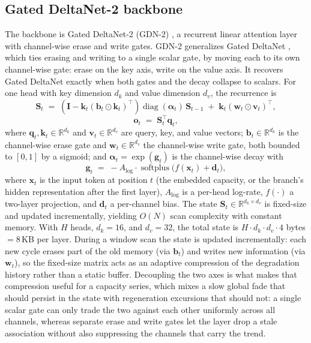\documentclass[final,5p,times,twocolumn]{elsarticle}
\begin{document}
\subsection{Gated DeltaNet-2 backbone}
\label{sec:gdn2}

The backbone is Gated DeltaNet-2 (GDN-2) \cite{ref_gdn2}, a
recurrent linear attention layer with channel-wise erase and write
gates. GDN-2 generalizes Gated DeltaNet \cite{ref_gdn}, which ties
erasing and writing to a single scalar gate, by moving each to its own
channel-wise gate: erase on the key axis, write on the value axis. It
recovers Gated DeltaNet exactly when both gates and the decay
collapse to scalars. For one head with key dimension $d_k$ and value dimension
$d_v$, the recurrence is
\begin{equation}
\label{eq:gdn2}
\mathbf{S}_t \;=\; \left( \mathbf{I} - \mathbf{k}_t(\mathbf{b}_t
\odot \mathbf{k}_t)^{\top} \right)
\operatorname{diag}(\boldsymbol{\alpha}_t)\, \mathbf{S}_{t-1}
\;+\; \mathbf{k}_t(\mathbf{w}_t \odot \mathbf{v}_t)^{\top},
\end{equation}
\begin{equation}
\label{eq:readout}
\mathbf{o}_t \;=\; \mathbf{S}_t^{\top}\mathbf{q}_t,
\end{equation}
where $\mathbf{q}_t,\mathbf{k}_t \in \mathbb{R}^{d_k}$ and
$\mathbf{v}_t \in \mathbb{R}^{d_v}$ are query, key, and value vectors;
$\mathbf{b}_t \in \mathbb{R}^{d_k}$ is the channel-wise erase gate and
$\mathbf{w}_t \in \mathbb{R}^{d_v}$ the channel-wise write gate, both
bounded to $[0,1]$ by a sigmoid; and
$\boldsymbol{\alpha}_t = \exp(\mathbf{g}_t)$ is the channel-wise decay
with
\begin{equation}
\mathbf{g}_t \;=\; -A_{\log}\cdot
\operatorname{softplus}\!\big( f(\mathbf{x}_t) + \mathbf{d}_t \big),
\end{equation}
where $\mathbf{x}_t$ is the input token at position $t$ (the embedded
capacity, or the branch's hidden representation after the first
layer), $A_{\log}$ is a per-head log-rate, $f(\cdot)$ a two-layer
projection, and $\mathbf{d}_t$ a per-channel bias. The state
$\mathbf{S}_t \in \mathbb{R}^{d_k \times d_v}$ is fixed-size and
updated incrementally, yielding $O(N)$ scan complexity with
constant memory. With $H$ heads, $d_k=16$, and $d_v=32$, the total
state is $H \cdot d_k \cdot d_v \cdot 4$ bytes $= 8$\,KB per layer.
During a window scan the state is updated incrementally: each new
cycle erases part of the old memory (via $\mathbf{b}_t$) and writes
new information (via $\mathbf{w}_t$), so the fixed-size matrix acts
as an adaptive compression of the degradation history rather than a
static buffer. Decoupling the two axes is what makes that compression
useful for a capacity series, which mixes a slow global fade that
should persist in the state with regeneration excursions that should
not: a single scalar gate can only trade the two against each other
uniformly across all channels, whereas separate erase and write gates
let the layer drop a stale association without also suppressing the
channels that carry the trend.
\end{document}
